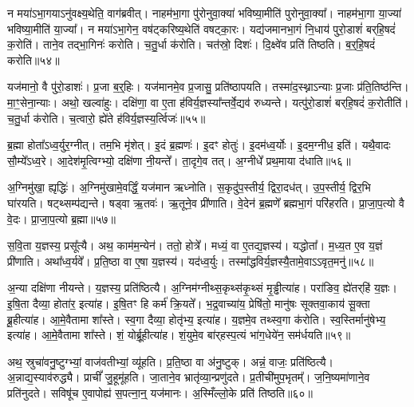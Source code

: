 न मया॑\-ऽभा॒गया\-ऽनु॑वक्ष्य॒थेति॒ वाग॑ब्रवीत्।
नाहम॑भा॒गा पु॑रोनुवा॒क्या॑ भविष्या॒मीति॑ पुरोनुवा॒क्या᳚।
नाहम॑भा॒गा या॒ज्या॑ भविष्या॒मीति॑ या॒ज्या᳚।
न मया॑\-ऽभा॒गेन॒ वष॑ट्करिष्य॒थेति॑ वषट्का॒रः।
यद्य॑जमानभा॒गं नि॒धाय॑ पुरो॒डाशं॑ बर्‌\mbox{}हि॒षदं॑ क॒रोति॑।
ताने॒व तद्भा॒गिनः॑ करोति।
च॒तु॒र्धा क॑रोति।
चत॑स्रो॒ दिशः॑।
दि॒क्ष्वे॑व प्रति॑ तिष्ठति।
ब॒र्॒हि॒षदं॑ करोति॥५४॥

यज॑मानो॒ वै पु॑रो॒डाशः॑।
प्र॒जा ब॒र्॒हिः।
यज॑मानमे॒व प्र॒जासु॒ प्रति॑\-ष्ठापयति।
तस्मा॑द॒स्थ्ना\-ऽन्याः प्र॒जाः प्र॑ति॒तिष्ठ॑न्ति।
मा॒ꣳ॒\-सेना॒न्याः।
अथो॒ खल्वा॑हुः।
दक्षि॑णा॒ वा ए॒ता ह॑विर्य॒ज्ञस्या᳚न्तर्वे॒द्यव॑ रुध्यन्ते।
यत्पु॑रो॒डाशं॑ बर्‌\mbox{}हि॒षदं॑ क॒रोतीति॑।
च॒तु॒र्धा क॑रोति।
च॒त्वारो॒ ह्ये॑ते ह॑विर्य॒ज्ञस्य॒र्त्विजः॑॥५५॥

ब्र॒ह्मा होता᳚\-ऽध्व॒र्युर॒ग्नीत्।
तम॒भि मृ॑शेत्।
इ॒दं ब्र॒ह्मणः॑।
इ॒दꣳ होतुः॑।
इ॒दम॑ध्व॒र्योः।
इ॒दम॒ग्नीध॒ इति॑।
यथै॒वादः सौ॒म्ये᳚\-ऽध्व॒रे।
आ॒देश॑मृ॒त्विग्भ्यो॒ दक्षि॑णा नी॒यन्ते᳚।
ता॒दृगे॒व तत्।
अ॒ग्नीधे᳚ प्रथ॒माया द॑धाति॥५६॥

अ॒ग्निमु॑खा॒ ह्यृद्धिः॑।
अ॒ग्निमु॑खामे॒वर्द्धिं॒ यज॑मान ऋध्नोति।
स॒कृदु॑प॒स्तीर्य॒ द्विरा॒दध॑त्।
उ॒प॒स्तीर्य॒ द्विर॒भि घा॑रयति।
षट्थ्सम्प॑द्यन्ते।
षड्वा ऋ॒तवः॑।
ऋ॒तूने॒व प्री॑णाति।
वे॒देन॑ ब्र॒ह्मणे᳚ ब्रह्मभा॒गं परि॑हरति।
प्रा॒जा॒प॒त्यो वै वे॒दः।
प्रा॒जा॒प॒त्यो ब्र॒ह्मा॥५७॥

स॒वि॒ता य॒ज्ञस्य॒ प्रसू᳚त्यै।
अथ॒ काम॑म॒न्येन॑।
ततो॒ होत्रे᳚।
मध्यं॒ वा ए॒तद्य॒ज्ञस्य॑।
यद्धोता᳚।
म॒ध्य॒त ए॒व य॒ज्ञं प्री॑णाति।
अथा᳚ध्व॒र्यवे᳚।
प्र॒ति॒ष्ठा वा ए॒षा य॒ज्ञस्य॑।
यद॑ध्व॒र्युः।
तस्मा᳚द्धविर्य॒ज्ञस्यै॒तामे॒वाऽऽवृत॒मनु॑॥५८॥

अ॒न्या दक्षि॑णा नीयन्ते।
य॒ज्ञस्य॒ प्रति॑\-ष्ठित्यै।
अ॒ग्निम॑ग्नीथ्स॒कृथ्स॑\-कृ॒थ्सं मृ॒ड्ढीत्या॑ह।
परा॑ङिव॒ ह्ये॑तर्‌\mbox{}हि॑ य॒ज्ञः।
इ॒षि॒ता दैव्या॒ होता॑र॒ इत्या॑ह।
इ॒षि॒तꣳ हि कर्म॑ क्रि॒यते᳚।
भ॒द्र॒वाच्या॑य॒ प्रेषि॑तो॒ मानु॑षः सूक्तवा॒काय॑ सू॒क्ता ब्रू॒हीत्या॑ह।
आ॒\-मे॒वैतामा शा᳚स्ते।
स्व॒गा दैव्या॒ होतृ॑भ्य॒ इत्या॑ह।
य॒ज्ञमे॒व तथ्स्व॒गा क॑रोति।
स्व॒स्तिर्मानु॑षेभ्य॒ इत्या॑ह।
आ॒\-मे॒वैतामा शा᳚स्ते।
शं॒ योर्ब्रू॒हीत्या॑ह।
शं॒युमे॒व बा॑र्‌\mbox{}हस्प॒त्यं भा॑ग॒धेये॑न॒ सम॑र्धयति॥५९॥

अथ॒ स्रुचा॑वनु॒ष्टुग्भ्यां॒ वाज॑वतीभ्यां॒ व्यू॑हति।
प्र॒ति॒ष्ठा वा अ॑नु॒ष्टुक्।
अन्नं॒ वाजः॒ प्रति॑\-ष्ठित्यै।
अ॒न्नाद्य॒स्याव॑रुद्ध्यै।
प्राचीं᳚ जु॒हूमू॑हति।
जा॒ताने॒व भ्रातृ॑व्या॒न्प्रणु॑दते।
प्र॒तीची॑मुप॒भृतम्᳚।
ज॒नि॒ष्यमा॑णाने॒व प्रति॑\-नुदते।
सविषू॑च ए॒वापोह्य॑ स॒पत्ना॒न्॒ यज॑मानः।
अ॒स्मिँल्लो॒के प्रति॑ तिष्ठति॥६०॥

